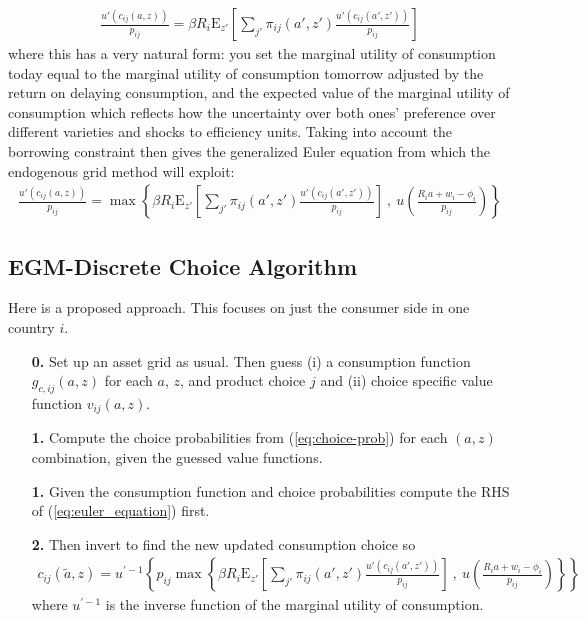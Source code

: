 \documentclass[12pt,pdftex]{article}
\begin{document}
\begin{onehalfspacing}
\begin{align}
\frac{u'(c_{ij}(a, z))}{p_{ij}} = \beta R_{i} \mathrm{E}_{z'} \left[ \sum_{j'} \pi_{ij}(a', z') \frac{u'(c_{ij}(a', z'))}{p_{ij}} \right]
\end{align}
where this has a very natural form: you set the marginal utility of consumption today equal to the marginal utility of consumption tomorrow adjusted by the return on delaying consumption, and the expected value of the marginal utility of consumption which reflects how the uncertainty over both ones' preference over different varieties and shocks to efficiency units. Taking into account the borrowing constraint then gives the generalized Euler equation from which the endogenous grid method will exploit:
\begin{align}
\frac{u'(c_{ij}(a, z))}{p_{ij}} = \max \left\{ \beta R_{i} \mathrm{E}_{z'} \left[ \sum_{j'} \pi_{ij}(a', z') \frac{u'(c_{ij}(a', z'))}{p_{ij}} \right] \ , \  u \left( \frac{R_i a + w_i - \phi_{i}}{p_{ij}} \right) \right \}
\label{eq:euler_equation}
\end{align}

\subsection{EGM-Discrete Choice Algorithm}

Here is a proposed approach. This focuses on just the consumer side in one country $i$.
\begin{itemize}
\item[\textbf{0.}] Set up an asset grid as usual. Then guess (i) a consumption function $g_{c,ij}(a,z)$ for each $a$, $z$, and product choice $j$ and (ii) choice specific value function $v_{ij}(a,z)$.

\item[\textbf{1.}] Compute the choice probabilities from (\ref{eq:choice-prob}) for each $(a,z)$ combination, given the guessed value functions.

\item[\textbf{1.}] Given the consumption function and choice probabilities compute the RHS of (\ref{eq:euler_equation}) first.

\item[\textbf{2.}] Then invert to find the new updated consumption choice so
\begin{align}
c_{ij}(\tilde a, z) = u^{' -1}\left\{ p_{ij} \max \left\{ \beta R_{i} \mathrm{E}_{z'} \left[ \sum_{j'} \pi_{ij}(a', z') \frac{u'(c_{ij}(a', z'))}{p_{ij}} \right] \ , \  u \left( \frac{R_i a + w_i - \phi_{i}}{p_{ij}} \right) \right \} \right \}
\end{align}
where $u^{' -1}$ is the inverse function of the marginal utility of consumption.


\end{itemize}
\end{onehalfspacing}
\end{document}
